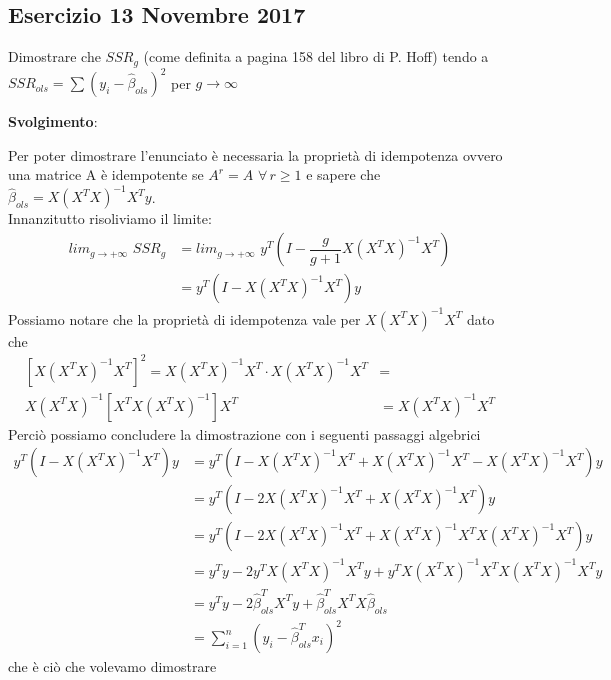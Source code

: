 \newcommand{\betaols}{\hat{\beta}_{ols}}

\subsection{Esercizio 13 Novembre 2017}
Dimostrare che $SSR_g$ (come definita a pagina 158 del libro di P. Hoff) tendo a $SSR_{ols} = \sum(y_i - \betaols)^2$ per $g \rightarrow \infty$

\textbf{Svolgimento}:
\\
\bigskip

Per poter dimostrare l'enunciato \`e necessaria la propriet\`a di idempotenza ovvero una matrice A \`e idempotente se $A^r = A \,\, \forall\, r \geqslant 1$ e sapere che $\betaols = X \left(X^T X \right)^{-1} X^T y$.\\
Innanzitutto risoliviamo il limite:\\
\begin{align*}
	lim_{g \rightarrow + \infty }\,\, SSR_g & = 	lim_{g \rightarrow + \infty } \,\, y^T \left(I - \dfrac{g}{g+1}  X \left(X^T X \right)^{-1} X^T \right) \\
	                                        & = y^T \left(I - X \left(X^T X \right)^{-1} X^T \right) y
\end{align*}
Possiamo notare che la propriet\`a di idempotenza vale per $X \left(X^T X \right)^{-1} X^T$ dato che
\begin{align*}
	\left[X \left(X^T X \right)^{-1} X^T\right]^2 = X \left(X^T X \right)^{-1} X^T \cdot X \left(X^T X \right)^{-1} X^T & = \\ X \left(X^T X \right)^{-1} \left[ X^T  X \left(X^T X \right)^{-1} \right] X^T  &=  X \left(X^T X \right)^{-1} X^T
\end{align*}
Perci\`o possiamo concludere la dimostrazione con i seguenti passaggi algebrici
\begin{align*}
	y^T \left(I - X \left(X^T X \right)^{-1} X^T \right) y & = y^T \left(I - X \left(X^T X \right)^{-1} X^T + X \left(X^T X \right)^{-1} X^T  - X \left(X^T X \right)^{-1} X^T \right) y \\ &= y^T \left(I - 2 X \left(X^T X \right)^{-1} X^T + X \left(X^T X \right)^{-1} X^T \right) y \\ &= y^T \left(I - 2 X \left(X^T X \right)^{-1} X^T + X \left(X^T X \right)^{-1} X^T X \left(X^T X \right)^{-1} X^T \right) y \\ &=
	y^Ty - 2 y^T X \left(X^T X \right)^{-1} X^T y + y^T X \left(X^T X \right)^{-1} X^T X \left(X^T X \right)^{-1} X^T y                                                                  \\ &=
	y^Ty - 2 \betaols^T X^T  y + \betaols^T X^T X \betaols                                                                                                                               \\ &= \sum_{i=1}^{n}(y_i - \betaols^T x_i)^2
\end{align*}
che \`e ci\`o che volevamo dimostrare